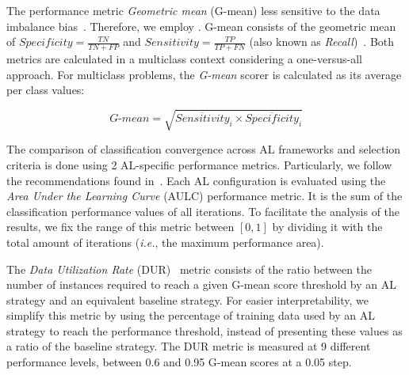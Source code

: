 \documentclass[remotesensing,article,submit,moreauthors,pdftex]{Definitions/mdpi}
\begin{document}
\begin{paracol}{2}
The performance metric \textit{Geometric mean} (G-mean)  less sensitive to the data imbalance
bias~\cite{Jeni2013, Kubat1997}.  Therefore, we employ . G-mean consists of the geometric mean of $Specificity = \frac{TN}{TN
+ FP}$ and $Sensitivity = \frac{TP}{TP+FN}$ (also known as
\textit{Recall})~\cite{Kubat1997}. Both metrics are calculated in a multiclass
context considering a one-versus-all approach. For multiclass problems, the
\textit{G-mean} scorer is calculated as its average per class values: 
        
\begin{equation*}
    \textit{G-mean} = \sqrt{\overline{Sensitivity}_i \times
    \overline{Specificity}_i}
\end{equation*}

    
The comparison of classification convergence across AL frameworks and
selection criteria is done using 2 AL-specific performance metrics.
Particularly, we follow the recommendations found in~\cite{Kottke2017}. Each
AL configuration is evaluated using the \textit{Area Under the Learning Curve}
(AULC) performance metric. It is the sum of the classification performance
values of all iterations. To facilitate the analysis of the results, we fix
the range of this metric between $[0,1]$ by dividing it with the total amount
of iterations (\textit{i.e.}, the maximum performance area). 

The \textit{Data Utilization Rate} (DUR)~\cite{Reitmaier2013} metric consists
of the ratio between the number of instances required to reach a given G-mean
score threshold by an AL strategy and an equivalent baseline strategy. For
easier interpretability, we simplify this metric by using the percentage
of training data used by an AL strategy to reach the performance threshold,
instead of presenting these values as a ratio of the baseline strategy. The
DUR metric is measured at 9 different performance levels, between
0.6 and 0.95 G-mean scores at a 0.05 step.


\end{paracol}
\end{document}
